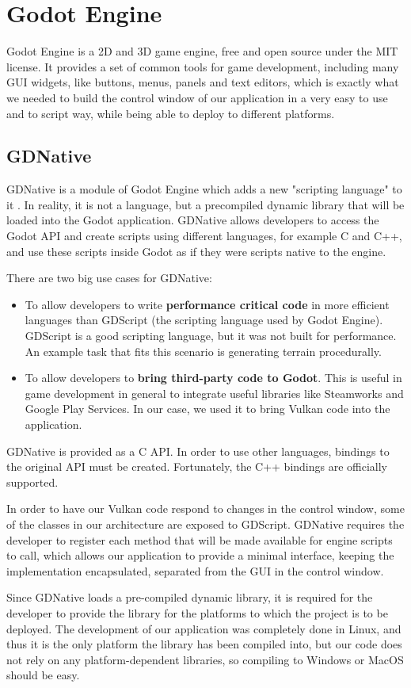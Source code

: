 \section{Godot Engine}
Godot Engine is a 2D and 3D game engine, free and open source under the MIT license. It provides a set of common tools for game development, including many GUI widgets, like buttons, menus, panels and text editors, which is exactly what we needed to build the control window of our application in a very easy to use and to script way, while being able to deploy to different platforms.

\subsection{GDNative}
GDNative is a module of Godot Engine which adds a new "scripting language" to it \cite{gdnative_post}. In reality, it is not a language, but a precompiled dynamic library that will be loaded into the Godot application. GDNative allows developers to access the Godot API and create scripts using different languages, for example C and C++,  and use these scripts inside Godot as if they were scripts native to the engine.

There are two big use cases for GDNative:

\begin{itemize}
    \item To allow developers to write \textbf{performance critical code} in more efficient languages than GDScript (the scripting language used by Godot Engine). GDScript is a good scripting language, but it was not built for performance. An example task that fits this scenario is generating terrain procedurally.
    \item To allow developers to \textbf{bring third-party code to Godot}. This is useful in game development in general to integrate useful libraries like Steamworks and Google Play Services. In our case, we used it to bring Vulkan code into the application.
\end{itemize}

GDNative is provided as a C API. In order to use other languages, bindings to the original API must be created. Fortunately, the C++ bindings are officially supported.

In order to have our Vulkan code respond to changes in the control window, some of the classes in our architecture are exposed to GDScript. GDNative requires the developer to register each method that will be made available for engine scripts to call, which allows our application to provide a minimal interface, keeping the implementation encapsulated, separated from the GUI in the control window.

Since GDNative loads a pre-compiled dynamic library, it is required for the developer to provide the library for the platforms to which the project is to be deployed. The development of our application was completely done in Linux, and thus it is the only platform the library has been compiled into, but our code does not rely on any platform-dependent libraries, so compiling to Windows or MacOS should be easy.
